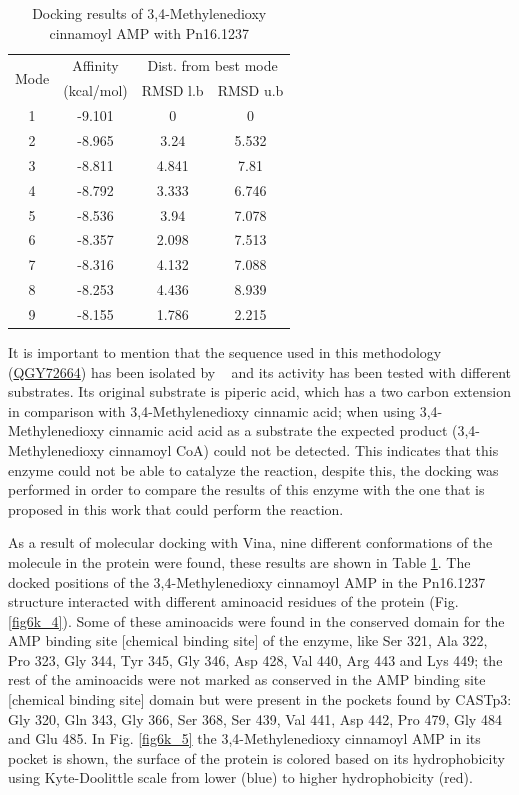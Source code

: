 \documentclass[12pt]{article}
\newcommand{\textcite}[1]{\citeauthor{#1}~\citeyear{#1}}
\begin{document}
	\begin{table}
		\centering
		\caption{Docking results of 3,4-Methylenedioxy cinnamoyl AMP with Pn16.1237}
		\label{table6k}
		\begin{tabular}{cccc}
			\toprule
			\multirow{2}{*}{Mode} & Affinity & \multicolumn{2}{c}{Dist. from best mode}\\
			&  (kcal/mol) & RMSD l.b & RMSD u.b\\
			\midrule
			1 & -9.101   &       0   &       0\\
			2 & -8.965   &    3.24   &   5.532\\
			3 & -8.811   &   4.841   &    7.81\\
			4 & -8.792   &   3.333   &   6.746\\
			5 & -8.536   &    3.94   &   7.078\\
			6 & -8.357   &   2.098   &   7.513\\
			7 & -8.316   &   4.132   &   7.088\\
			8 & -8.253   &   4.436   &   8.939\\
			9 & -8.155   &   1.786   &   2.215\\
			\bottomrule
			
		\end{tabular}
	\end{table}
	
	It is important to mention that the sequence used in this methodology (\href{https://www.ncbi.nlm.nih.gov/protein/QGY72664.1/}{QGY72664}) has been isolated by \textcite{coaligase} and its activity has been tested with different substrates. Its original substrate is piperic acid, which has a two carbon extension in comparison with 3,4-Methylenedioxy cinnamic acid; when using 3,4-Methylenedioxy cinnamic acid acid as a substrate the expected product (3,4-Methylenedioxy cinnamoyl CoA) could not be detected. This indicates that this enzyme could not be able to catalyze the reaction, despite this, the docking was performed in order to compare the results of this enzyme with the one that is proposed in this work that could perform the reaction.
	
	As a result of molecular docking with Vina, nine different conformations of the molecule in the protein were found, these results are shown in Table \ref{table6k}. The docked positions of the 3,4-Methylenedioxy cinnamoyl AMP in the Pn16.1237 structure interacted with different aminoacid residues of the protein (Fig. \ref{fig6k_4}). Some of these aminoacids were found in the conserved domain for the AMP binding site [chemical binding site] of the enzyme, like Ser 321, Ala 322, Pro 323, Gly 344, Tyr 345, Gly 346, Asp 428, Val 440, Arg 443 and Lys 449; the rest of the aminoacids were not marked as conserved in the AMP binding site [chemical binding site] domain but were present in the pockets found by CASTp3: Gly 320, Gln 343, Gly 366, Ser 368, Ser 439, Val 441, Asp 442, Pro 479, Gly 484 and Glu 485. In Fig. \ref{fig6k_5} the 3,4-Methylenedioxy cinnamoyl AMP in its pocket is shown, the surface of the protein is colored based on its hydrophobicity using Kyte-Doolittle scale from lower (blue) to higher hydrophobicity (red).
	
\end{document}
